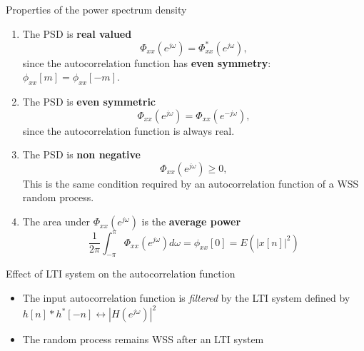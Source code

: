 \documentclass[10pt, aspectratio=169]{beamer}
\begin{document}
\begin{frame}{Properties of the power spectrum density}

\begin{enumerate} 
	\item The PSD is \textbf{real valued}
	\begin{equation*}
	\Phi_{xx}(e^{j\omega}) = \Phi^*_{xx}(e^{j\omega}),
	\end{equation*}
	since the autocorrelation function has\textbf{ even symmetry}: $\phi_{xx}[m] = \phi_{xx}[-m]$.
	
	\item The PSD is \textbf{even symmetric} 
	\begin{equation*}
	\Phi_{xx}(e^{j\omega}) = \Phi_{xx}(e^{-j\omega}),
	\end{equation*}
	since the autocorrelation function is always real. 
	
	\item The PSD is \textbf{non negative} 
	\begin{equation*}
	\Phi_{xx}(e^{j\omega}) \geq 0,
	\end{equation*}
	This is the same condition required by an autocorrelation function of a WSS random process.
	
	\item The area under $\Phi_{xx}(e^{j\omega})$ is the \textbf{average power}
	\begin{equation*}
	\frac{1}{2\pi}\int_{-\pi}^{\pi} \Phi_{xx}(e^{j\omega})d\omega = \phi_{xx}[0] = E(|x[n]|^2)
	\end{equation*}
	
\end{enumerate} 

\end{frame}

\begin{frame}{Effect of LTI system on the autocorrelation function}
\begin{center}
	\resizebox{0.6\linewidth}{!}{}
\end{center}

\begin{itemize}
	\item The input autocorrelation function is \textit{filtered} by the LTI system defined by $h[n]\ast h^*[-n] \leftrightarrow |H(e^{j\omega})|^2$ 
	\item The random process remains WSS after an LTI system
\end{itemize}

\end{frame}
\end{document}
